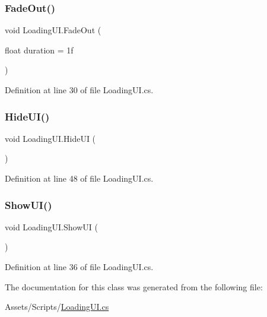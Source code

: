 \subsubsection{\texorpdfstring{FadeOut()}{FadeOut()}}
{\footnotesize\ttfamily void Loading\+U\+I.\+Fade\+Out (\begin{DoxyParamCaption}\item[{float}]{duration = {\ttfamily 1f} }\end{DoxyParamCaption})}



Definition at line 30 of file Loading\+U\+I.\+cs.

\mbox{\label{class_loading_u_i_a4b195dd7d9b45cbe16506f67e2d8bf10}} 
\subsubsection{\texorpdfstring{HideUI()}{HideUI()}}
{\footnotesize\ttfamily void Loading\+U\+I.\+Hide\+UI (\begin{DoxyParamCaption}{ }\end{DoxyParamCaption})}



Definition at line 48 of file Loading\+U\+I.\+cs.

\mbox{\label{class_loading_u_i_a117b66becd8ec50738d5bb53395c5638}} 
\subsubsection{\texorpdfstring{ShowUI()}{ShowUI()}}
{\footnotesize\ttfamily void Loading\+U\+I.\+Show\+UI (\begin{DoxyParamCaption}{ }\end{DoxyParamCaption})}



Definition at line 36 of file Loading\+U\+I.\+cs.



The documentation for this class was generated from the following file\+:\begin{DoxyCompactItemize}
\item 
Assets/\+Scripts/\mbox{\hyperlink{_loading_u_i_8cs}{Loading\+U\+I.\+cs}}\end{DoxyCompactItemize}
